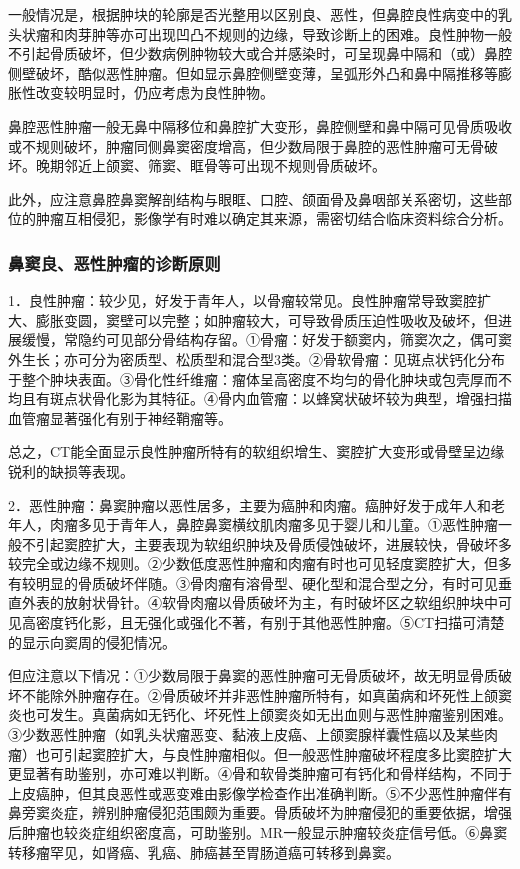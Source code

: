 一般情况是，根据肿块的轮廓是否光整用以区别良、恶性，但鼻腔良性病变中的乳头状瘤和肉芽肿等亦可出现凹凸不规则的边缘，导致诊断上的困难。良性肿物一般不引起骨质破坏，但少数病例肿物较大或合并感染时，可呈现鼻中隔和（或）鼻腔侧壁破坏，酷似恶性肿瘤。但如显示鼻腔侧壁变薄，呈弧形外凸和鼻中隔推移等膨胀性改变较明显时，仍应考虑为良性肿物。

鼻腔恶性肿瘤一般无鼻中隔移位和鼻腔扩大变形，鼻腔侧壁和鼻中隔可见骨质吸收或不规则破坏，肿瘤同侧鼻窦密度增高，但少数局限于鼻腔的恶性肿瘤可无骨破坏。晚期邻近上颌窦、筛窦、眶骨等可出现不规则骨质破坏。

此外，应注意鼻腔鼻窦解剖结构与眼眶、口腔、颌面骨及鼻咽部关系密切，这些部位的肿瘤互相侵犯，影像学有时难以确定其来源，需密切结合临床资料综合分析。

\subsubsection{鼻窦良、恶性肿瘤的诊断原则}

1．良性肿瘤：较少见，好发于青年人，以骨瘤较常见。良性肿瘤常导致窦腔扩大、膨胀变圆，窦壁可以完整；如肿瘤较大，可导致骨质压迫性吸收及破坏，但进展缓慢，常隐约可见部分骨结构存留。①骨瘤：好发于额窦内，筛窦次之，偶可窦外生长；亦可分为密质型、松质型和混合型3类。②骨软骨瘤：见斑点状钙化分布于整个肿块表面。③骨化性纤维瘤：瘤体呈高密度不均匀的骨化肿块或包壳厚而不均且有斑点状骨化影为其特征。④骨内血管瘤：以蜂窝状破坏较为典型，增强扫描血管瘤显著强化有别于神经鞘瘤等。

总之，CT能全面显示良性肿瘤所特有的软组织增生、窦腔扩大变形或骨壁呈边缘锐利的缺损等表现。

2．恶性肿瘤：鼻窦肿瘤以恶性居多，主要为癌肿和肉瘤。癌肿好发于成年人和老年人，肉瘤多见于青年人，鼻腔鼻窦横纹肌肉瘤多见于婴儿和儿童。①恶性肿瘤一般不引起窦腔扩大，主要表现为软组织肿块及骨质侵蚀破坏，进展较快，骨破坏多较完全或边缘不规则。②少数低度恶性肿瘤和肉瘤有时也可见轻度窦腔扩大，但多有较明显的骨质破坏伴随。③骨肉瘤有溶骨型、硬化型和混合型之分，有时可见垂直外表的放射状骨针。④软骨肉瘤以骨质破坏为主，有时破坏区之软组织肿块中可见高密度钙化影，且无强化或强化不著，有别于其他恶性肿瘤。⑤CT扫描可清楚的显示向窦周的侵犯情况。

但应注意以下情况：①少数局限于鼻窦的恶性肿瘤可无骨质破坏，故无明显骨质破坏不能除外肿瘤存在。②骨质破坏并非恶性肿瘤所特有，如真菌病和坏死性上颌窦炎也可发生。真菌病如无钙化、坏死性上颌窦炎如无出血则与恶性肿瘤鉴别困难。③少数恶性肿瘤（如乳头状瘤恶变、黏液上皮癌、上颌窦腺样囊性癌以及某些肉瘤）也可引起窦腔扩大，与良性肿瘤相似。但一般恶性肿瘤破坏程度多比窦腔扩大更显著有助鉴别，亦可难以判断。④骨和软骨类肿瘤可有钙化和骨样结构，不同于上皮癌肿，但其良恶性或恶变难由影像学检查作出准确判断。⑤不少恶性肿瘤伴有鼻旁窦炎症，辨别肿瘤侵犯范围颇为重要。骨质破坏为肿瘤侵犯的重要依据，增强后肿瘤也较炎症组织密度高，可助鉴别。MR一般显示肿瘤较炎症信号低。⑥鼻窦转移瘤罕见，如肾癌、乳癌、肺癌甚至胃肠道癌可转移到鼻窦。

